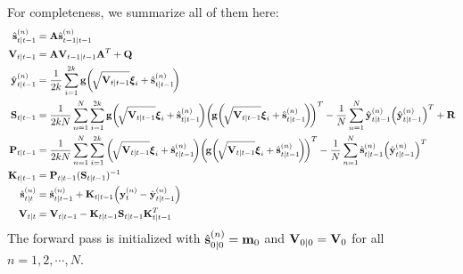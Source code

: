 		For completeness, we summarize all of them here:
		\begin{align*}
			\hat{\vec{s}}_{t \subgiven t - 1}^{(n)} &= \mat{A} \hat{\vec{s}}_{t - 1 \subgiven t - 1}^{(n)} \\
			\mat{V}_{t \subgiven t - 1} &= \mat{A} \mat{V}_{t - 1 \subgiven t - 1} \mat{A}^T + \mat{Q} \\
			\hat{\vec{y}}_{t \subgiven t - 1}^{(n)} &= \frac{1}{2k} \sum_{i = 1}^{2k} \vec{g}\bigg(\! \sqrt{\mat{V}_{t \subgiven t - 1}} \vec{\xi}_i + \hat{\vec{s}}_{t \subgiven t - 1}^{(n)} \!\bigg) \\
			\mat{S}_{t \subgiven t - 1} &= \frac{1}{2kN} \sum_{n = 1}^{N} \sum_{i = 1}^{2k} \vec{g}\bigg(\!\sqrt{\mat{V}_{t \subgiven t - 1}} \vec{\xi}_i + \hat{\vec{s}}_{t \subgiven t - 1}^{(n)}\!\bigg) \bigg(\!\vec{g}\bigg(\!\sqrt{\mat{V}_{t \subgiven t - 1}} \vec{\xi}_i + \hat{\vec{s}}_{t \subgiven t - 1}^{(n)}\!\bigg)\!\bigg)^T - \frac{1}{N} \sum_{n = 1}^{N} \hat{\vec{y}}_{t \subgiven t - 1}^{(n)} \Big( \hat{\vec{y}}_{t \subgiven t - 1}^{(n)} \Big)^T + \mat{R} \\
			\mat{P}_{t \subgiven t - 1} &= \frac{1}{2kN} \sum_{n = 1}^{N}  \sum_{i = 1}^{2k} \bigg(\!\sqrt{\mat{V}_{t \subgiven t - 1}} \vec{\xi}_i + \hat{\vec{s}}_{t \subgiven t - 1}^{(n)}\!\bigg) \bigg(\!\vec{g}\bigg(\!\sqrt{\mat{V}_{t \subgiven t - 1}} \vec{\xi}_i + \hat{\vec{s}}_{t \subgiven t - 1}^{(n)}\!\bigg)\!\bigg)^T - \frac{1}{N} \sum_{n = 1}^{N} \hat{\vec{s}}_{t \subgiven t - 1}^{(n)} \Big(\hat{\vec{y}}_{t \subgiven t - 1}^{(n)}\Big)^T \\
			\mat{K}_{t \subgiven t - 1} &= \mat{P}_{t \subgiven t - 1} (\mat{S}_{t \subgiven t - 1})^{-1} \\
			\hat{\vec{s}}_{t \subgiven t}^{(n)} &= \hat{\vec{s}}_{t \subgiven t - 1}^{(n)} + \mat{K}_{t \subgiven t - 1} \Big(\vec{y}_t^{(n)} - \hat{\vec{y}}_{t \subgiven t - 1}^{(n)}\Big) \\
			\mat{V}_{t \subgiven t} &= \mat{V}_{t \subgiven t - 1} - \mat{K}_{t \subgiven t - 1} \mat{S}_{t \subgiven t - 1} \mat{K}_{t \subgiven t - 1}^T
		\end{align*}
		The forward pass is initialized with \( \hat{\boldsymbol{\mathrm{s}}}_{0 \vert 0}^{(n)} = \boldsymbol{\mathrm{m}}_0 \) and \( \boldsymbol{\mathrm{V}}_{0 \vert 0} = \boldsymbol{\mathrm{V}}_0 \) for all \( n = 1, 2, \cdots, N \).

